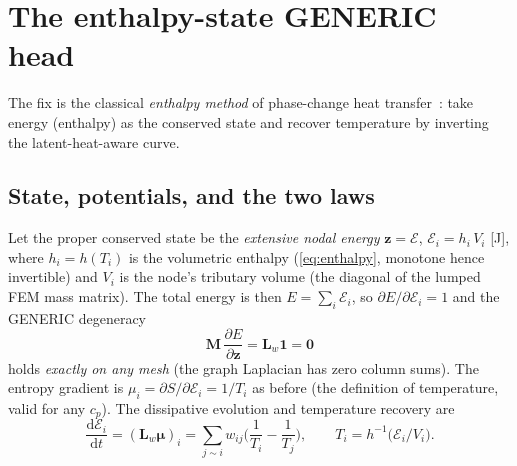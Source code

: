 \documentclass[11pt]{article}
\newcommand{\dd}{\mathrm{d}}
\newcommand{\Lw}{\bm{L}_{\!w}}
\newcommand{\bmu}{\bm{\mu}}
\theoremstyle{definition}
\begin{document}
\section{The enthalpy-state GENERIC head}
\label{sec:enthalpy}

The fix is the classical \emph{enthalpy method} of phase-change heat
transfer~\cite{voller1987enthalpy}: take energy (enthalpy) as the conserved state and
recover temperature by inverting the latent-heat-aware curve.

\subsection{State, potentials, and the two laws}

Let the proper conserved state be the \emph{extensive nodal energy}
$\bm z=\bm{\mathcal E}$, $\mathcal E_i = h_i\,V_i$ [\si{J}], where $h_i=h(T_i)$ is the
volumetric enthalpy (\cref{eq:enthalpy}, monotone hence invertible) and $V_i$ is the
node's tributary volume (the diagonal of the lumped FEM mass matrix). The total energy
is then $E=\sum_i\mathcal E_i$, so $\partial E/\partial\mathcal E_i = 1$ and the GENERIC
degeneracy
\begin{equation}
  \bm M\,\frac{\partial E}{\partial\bm z}=\Lw\bm 1=\bm 0
  \label{eq:degen_exact}
\end{equation}
holds \emph{exactly on any mesh} (the graph Laplacian has zero column sums). The entropy
gradient is $\mu_i=\partial S/\partial\mathcal E_i=1/T_i$ as before (the definition of
temperature, valid for any $c_p$). The dissipative evolution and temperature recovery are
\begin{equation}
  \boxed{\;\frac{\dd \mathcal E_i}{\dd t} = (\Lw\bmu)_i
    = \sum_{j\sim i} w_{ij}\Big(\frac{1}{T_i}-\frac{1}{T_j}\Big),
    \qquad T_i = h^{-1}\!\big(\mathcal E_i/V_i\big).\;}
  \label{eq:enthalpyevol}
\end{equation}
\end{document}
